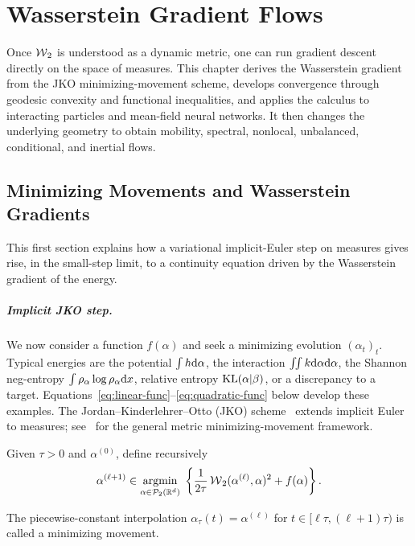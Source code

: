 
\chapter{Wasserstein Gradient Flows}
\label{sec-wasserstein-gradient-flows}

Once $\operatorname{\mathcal{W}}_2$ is understood as a dynamic metric, one can run gradient descent directly on the space of measures. This chapter derives the Wasserstein gradient from the JKO minimizing-movement scheme, develops convergence through geodesic convexity and functional inequalities, and applies the calculus to interacting particles and mean-field neural networks. It then changes the underlying geometry to obtain mobility, spectral, nonlocal, unbalanced, conditional, and inertial flows.

\section{Minimizing Movements and Wasserstein Gradients}

This first section explains how a variational implicit-Euler step on measures gives rise, in the small-step limit, to a continuity equation driven by the Wasserstein gradient of the energy.

\paragraph{Implicit JKO step.}
We now consider a function $f(\alpha)$ and seek a minimizing evolution $(\alpha_t)_t$. Typical energies are the potential $\int h\mathrm{d}\alpha$, the interaction $\iint k\mathrm{d}\alpha\mathrm{d}\alpha$, the Shannon neg-entropy $\int\rho_\alpha\log\rho_\alpha\mathrm{d} x$, relative entropy $\operatorname{KL}(\alpha|\beta)$, or a discrepancy to a target. Equations~\eqref{eq:linear-func}--\eqref{eq:quadratic-func} below develop these examples. The Jordan--Kinderlehrer--Otto (JKO) scheme~\cite{jordan1998variational} extends implicit Euler to measures; see~\cite{ambrosio2006gradient} for the general metric minimizing-movement framework.

\begin{defn}\label{def-jko-minimizing-movement}
Given $\tau>0$ and $\alpha^{(0)}$, define recursively
\begin{equation}
    \alpha^{(\ell+1)} \in \underset{\alpha\in\mathcal{P}_2(\mathbb{R}^d)}{\operatorname{argmin}}\;
    \left\{\frac{1}{2 \tau} \operatorname{\mathcal{W}}_2(\alpha^{(\ell)}, \alpha)^2 + f(\alpha)\right\}. \label{eq:jko-discr}
\end{equation}
\end{defn}
The piecewise-constant interpolation $\alpha_\tau(t)=\alpha^{(\ell)}$ for $t\in[\ell\tau,(\ell+1)\tau)$ is called a minimizing movement.



